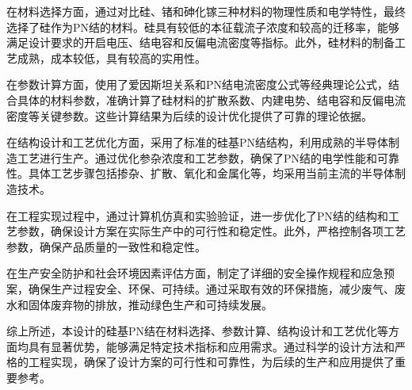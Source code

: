 \documentclass[12pt,hyperref,a4paper,UTF8]{ctexart}
\begin{document}
在材料选择方面，通过对比硅、锗和砷化镓三种材料的物理性质和电学特性，最终选择了硅作为PN结的材料。硅具有较低的本征载流子浓度和较高的迁移率，能够满足设计要求的开启电压、结电容和反偏电流密度等指标。此外，硅材料的制备工艺成熟，成本较低，具有较高的实用性。

在参数计算方面，使用了爱因斯坦关系和PN结电流密度公式等经典理论公式，结合具体的材料参数，准确计算了硅材料的扩散系数、内建电势、结电容和反偏电流密度等关键参数。这些计算结果为后续的设计优化提供了可靠的理论依据。

在结构设计和工艺优化方面，采用了标准的硅基PN结结构，利用成熟的半导体制造工艺进行生产。通过优化参杂浓度和工艺参数，确保了PN结的电学性能和可靠性。具体工艺步骤包括掺杂、扩散、氧化和金属化等，均采用当前主流的半导体制造技术。

在工程实现过程中，通过计算机仿真和实验验证，进一步优化了PN结的结构和工艺参数，确保设计方案在实际生产中的可行性和稳定性。此外，严格控制各项工艺参数，确保产品质量的一致性和稳定性。

在生产安全防护和社会环境因素评估方面，制定了详细的安全操作规程和应急预案，确保生产过程安全、环保、可持续。通过采取有效的环保措施，减少废气、废水和固体废弃物的排放，推动绿色生产和可持续发展。

综上所述，本设计的硅基PN结在材料选择、参数计算、结构设计和工艺优化等方面均具有显著优势，能够满足特定技术指标和应用需求。通过科学的设计方法和严格的工程实现，确保了设计方案的可行性和可靠性，为后续的生产和应用提供了重要参考。


% 
% 
\end{document}
